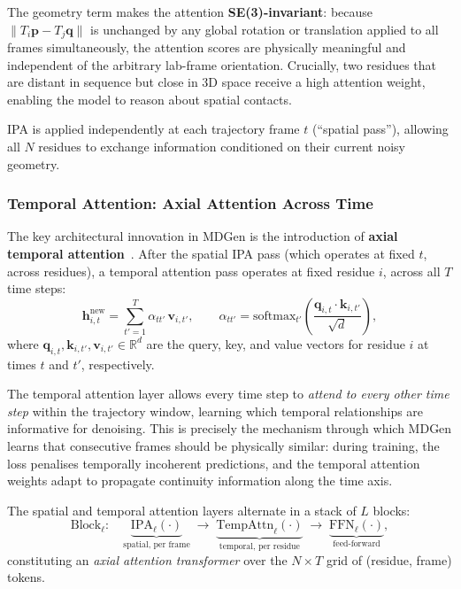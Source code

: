 \documentclass[11pt,a4paper]{article}
\newcommand{\RR}{\mathbb{R}}
\begin{document}
The geometry term makes the attention \textbf{SE(3)-invariant}: because $\|T_i \bm{p} - T_j
\bm{q}\|$ is unchanged by any global rotation or translation applied to all frames simultaneously,
the attention scores are physically meaningful and independent of the arbitrary lab-frame
orientation.  Crucially, two residues that are distant in sequence but close in 3D space receive a
high attention weight, enabling the model to reason about spatial contacts.

IPA is applied independently at each trajectory frame $t$ (``spatial pass''), allowing all
$N$ residues to exchange information conditioned on their current noisy geometry.

\subsubsection{Temporal Attention: Axial Attention Across Time}
\label{sec:temporal_attention}

The key architectural innovation in MDGen is the introduction of \textbf{axial temporal attention}~\cite{ho2019axial}.
After the spatial IPA pass (which operates at fixed $t$, across residues), a temporal attention
pass operates at fixed residue $i$, across all $T$ time steps:
\begin{equation}
  \bm{h}_{i,t}^{\text{new}} = \sum_{t'=1}^{T} \alpha_{tt'}\,\bm{v}_{i,t'},
  \qquad
  \alpha_{tt'} = \text{softmax}_{t'}\!\!\left(\frac{\bm{q}_{i,t} \cdot \bm{k}_{i,t'}}{\sqrt{d}}\right),
  \label{eq:temporal_attn}
\end{equation}
where $\bm{q}_{i,t}, \bm{k}_{i,t'}, \bm{v}_{i,t'} \in \RR^d$ are the query, key, and value
vectors for residue $i$ at times $t$ and $t'$, respectively.

The temporal attention layer allows every time step to \emph{attend to every other time step}
within the trajectory window, learning which temporal relationships are informative for denoising.
This is precisely the mechanism through which MDGen learns that consecutive frames should be
physically similar: during training, the loss penalises temporally incoherent predictions, and the
temporal attention weights adapt to propagate continuity information along the time axis.

The spatial and temporal attention layers alternate in a stack of $L$ blocks:
\begin{equation}
  \text{Block}_\ell:\quad
  \underbrace{\text{IPA}_\ell(\cdot)}_{\text{spatial, per frame}} \;\to\;
  \underbrace{\text{TempAttn}_\ell(\cdot)}_{\text{temporal, per residue}} \;\to\;
  \underbrace{\text{FFN}_\ell(\cdot)}_{\text{feed-forward}},
\end{equation}
constituting an \emph{axial attention transformer} over the $N \times T$ grid of (residue, frame)
tokens.
\end{document}
